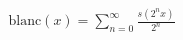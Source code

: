 \documentclass[preview]{standalone}
\begin{document}
\begin{align*}
\text{blanc}(x) = \sum_{n=0}^{\infty} \frac{s(2^n x)}{2^n}
\end{align*}
\end{document}
